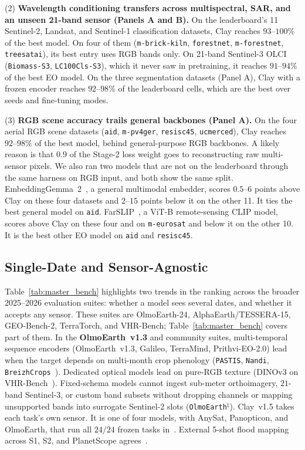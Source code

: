 (2) \textbf{Wavelength conditioning transfers across multispectral, SAR, and an unseen 21-band sensor (Panels A and B).} On the leaderboard's 11 Sentinel-2, Landsat, and Sentinel-1 classification datasets, Clay reaches $93\text{--}100\%$ of the best model. On four of them (\texttt{m-brick-kiln}, \texttt{forestnet}, \texttt{m-forestnet}, \texttt{treesatai}), its best entry uses RGB bands only. On 21-band Sentinel-3 OLCI (\texttt{Biomass-S3}, \texttt{LC100Cls-S3}), which it never saw in pretraining, it reaches $91\text{--}94\%$ of the best EO model. On the three segmentation datasets (Panel A), Clay with a frozen encoder reaches $92\text{--}98\%$ of the leaderboard cells, which are the best over seeds and fine-tuning modes.

(3) \textbf{RGB scene accuracy trails general backbones (Panel A).} On the four aerial RGB scene datasets (\texttt{aid}, \texttt{m-pv4ger}, \texttt{resisc45}, \texttt{ucmerced}), Clay reaches $92\text{--}98\%$ of the best model, behind general-purpose RGB backbones. A likely reason is that $0.9$ of the Stage-2 loss weight goes to reconstructing raw multi-sensor pixels. We also ran two models that are not on the leaderboard through the same harness on RGB input, and both show the same split. EmbeddingGemma~2~\cite{schechtervera2026embeddinggemma2}, a general multimodal embedder, scores $0.5\text{--}6$ points above Clay on these four datasets and $2\text{--}15$ points below it on the other 11. It ties the best general model on \texttt{aid}. FarSLIP~\cite{li2025farslip}, a ViT-B remote-sensing CLIP model, scores above Clay on these four and on \texttt{m-eurosat} and below it on the other 10. It is the best other EO model on \texttt{aid} and \texttt{resisc45}.

\subsection{Single-Date and Sensor-Agnostic}
\label{sec:aef_eval}

Table~\ref{tab:master_bench} highlights two trends in the ranking across the broader 2025--2026 evaluation suites: whether a model sees several dates, and whether it accepts any sensor. These suites are OlmoEarth-24, AlphaEarth/\allowbreak TESSERA-15, GEO-Bench-2, TerraTorch, and VHR-Bench; Table~\ref{tab:master_bench} covers part of them. In the \textbf{OlmoEarth~v1.3} and community suites, multi-temporal sequence encoders (OlmoEarth~v1.3, Galileo, TerraMind, Prithvi-EO-2.0) lead when the target depends on multi-month crop phenology (\texttt{PASTIS}, \texttt{Nandi}, \texttt{Breizh\-Crops}~\cite{olmoearth2026v13}). Dedicated optical models lead on pure-RGB texture (DINOv3 on VHR-Bench~\cite{sharma2026vhrbench}). Fixed-schema models cannot ingest sub-meter orthoimagery, $21$-band Sentinel-3, or custom band subsets without dropping channels or mapping unsupported bands into surrogate Sentinel-2 slots (\texttt{Olmo\-Earth}$^\natural$). Clay~v1.5 takes each task's own sensor. It is one of four models, with AnySat, Panopticon, and OlmoEarth, that run all $24/24$ frozen tasks in~\cite{olmoearth2026v13}. External 5-shot flood mapping across S1, S2, and PlanetScope agrees~\cite{kaushik2026flood}.

